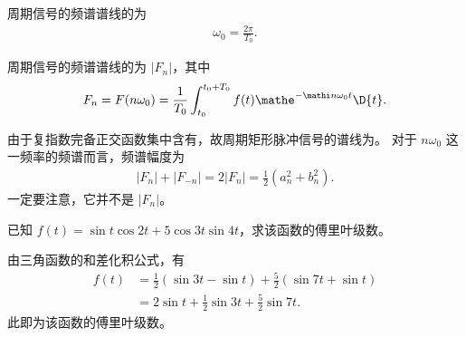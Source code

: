 \begin{property}[周期信号的频谱谱线的特点]
    周期信号的频谱谱线的为
    \begin{align*}
        \omega_0 = \frac{2\pi}{T_0}.
    \end{align*}
    
    周期信号的频谱谱线的为 $|F_n|$，其中
    \begin{align*}
        F_n = F(n\omega_0) = \frac{1}{T_0}\int_{t_0}^{t_0 + T_0}f(t)\mathe^{-\mathi n\omega_0 t}\D{t}.
    \end{align*}
\end{property}

\begin{note}
    由于复指数完备正交函数集中含有，故周期矩形脉冲信号的谱线为。
    对于 $n\omega_0$ 这一频率的频谱而言，频谱幅度为
    \begin{align*}
        |F_n| + |F_{-n}| = 2|F_n| = \frac{1}{2}\left(a_n^2 + b_n^2\right).
    \end{align*}
    一定要注意，它并不是 $|F_n|$。
\end{note}

\begin{homework}
    已知 $f(t) = \sin t\cos 2t + 5\cos 3t \sin 4t$，求该函数的傅里叶级数。
\end{homework}

\begin{solution}
    由三角函数的和差化积公式，有
    \begin{align*}
        f(t) & = \frac{1}{2}\left(\sin 3t - \sin t\right) + \frac{5}{2}\left(\sin 7t + \sin t\right) \\
        & = 2\sin t + \frac{1}{2}\sin 3t + \frac{5}{2}\sin 7t.
    \end{align*}
    此即为该函数的傅里叶级数。
\end{solution}
